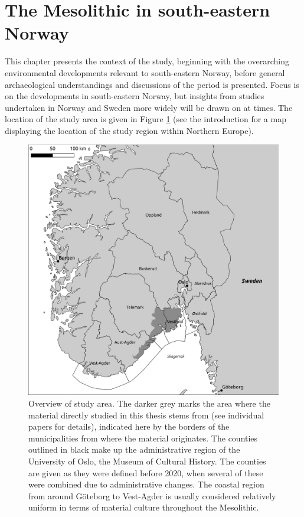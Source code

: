 \documentclass[
  a4paper,
  oneside]{uiophdthesis}
\begin{document}
\hypertarget{the-mesolithic-in-south-eastern-norway}{%
\section{The Mesolithic in south-eastern Norway}\label{the-mesolithic-in-south-eastern-norway}}

This chapter presents the context of the study, beginning with the overarching environmental developments relevant to south-eastern Norway, before general archaeological understandings and discussions of the period is presented. Focus is on the developments in south-eastern Norway, but insights from studies undertaken in Norway and Sweden more widely will be drawn on at times. The location of the study area is given in Figure \ref{fig:overview} (see the introduction for a map displaying the location of the study region within Northern Europe).

\begin{figure}

{\centering \includegraphics[width=1\linewidth]{figures/overview} 

}

\caption{Overview of study area. The darker grey marks the area where the material directly studied in this thesis stems from (see individual papers for details), indicated here by the borders of the municipalities from where the material originates. The counties outlined in black make up the administrative region of the University of Oslo, the Museum of Cultural History. The counties are given as they were defined before 2020, when several of these were combined due to administrative changes. The coastal region from around Göteborg to Vest-Agder is usually considered relatively uniform in terms of material culture throughout the Mesolithic.}\label{fig:overview}
\end{figure}
\end{document}
